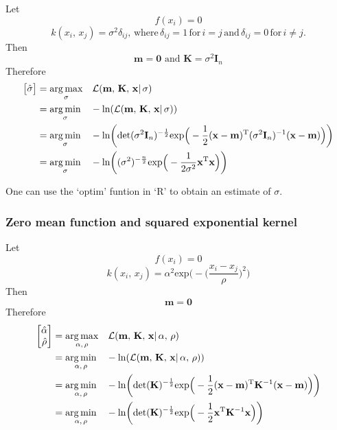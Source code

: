          Let \[f(x_{i}) = 0\]
          \[k(x_{i},\, x_{j}) = \sigma^2\delta_{ij}, \, \text{where} \, \delta_{ij} = 1 \, \text{for} \, i = j \, \text{and} \, \delta_{ij} = 0 \, \text{for} \, i \neq j.\]
         Then \[\mathbf{m} = \mathbf{0} \text{ and } \mathbf{K} = \sigma^2\mathbf{I}_{n}\]
         Therefore
         \begin{align*}
            \begin{bmatrix} \hat{\sigma} \end{bmatrix}
            & = \underset{\sigma}{\arg\max} \quad \mathcal{L}(\mathbf{m} ,\, \mathbf{K} ,\, \mathbf{x}| \, \sigma)\\
            & = \underset{\sigma}{\arg\min} \quad -\text{ln}(\mathcal{L}(\mathbf{m} ,\, \mathbf{K} ,\, \mathbf{x}| \, \sigma))\\
            & = \underset{\sigma}{\arg\min} \quad -\text{ln} \bigg(\text{det}(\sigma^2\mathbf{I}_{n})^{-\frac{1}{2}} 
            \text{exp} \Big(-\frac{1}{2} (\mathbf{x} - \mathbf{m})^{\text{\text{T}}} (\sigma^2\mathbf{I}_{n})^{-1} (\mathbf{x} - \mathbf{m}) \Big) \bigg)\\
            & = \underset{\sigma}{\arg\min} \quad -\text{ln} \bigg((\sigma^2)^{-\frac{n}{2}} 
            \text{exp} \Big(-\frac{1}{2\sigma^2} \mathbf{x}^{\text{\text{T}}} \mathbf{x} \Big) \bigg)
         \end{align*}
         
         One can use the `optim' funtion in `R' to obtain an estimate of \(\sigma\).

      \subsubsection{Zero mean function and squared exponential kernel}

         Let \[f(x_{i}) = 0\]
            \[k(x_{i},\, x_{j}) = \alpha^{2} \text{exp} \bigg(- \Big(\frac{x_i - x_j}{\rho} \Big)^2 \bigg)\]
         Then \[\mathbf{m} = \mathbf{0}\]
         Therefore
         \begin{align*}
            \begin{bmatrix} \hat{\alpha} \\ \hat{\rho} \end{bmatrix}
            & = \underset{\alpha ,\, \rho}{\arg\max} \quad \mathcal{L}(\mathbf{m} ,\, \mathbf{K} ,\, \mathbf{x}| \, \alpha ,\, \rho)\\
            & = \underset{\alpha ,\, \rho}{\arg\min} \quad -\text{ln}(\mathcal{L}(\mathbf{m} ,\, \mathbf{K} ,\, \mathbf{x}| \, \alpha ,\, \rho))\\
            & = \underset{\alpha ,\, \rho}{\arg\min} \quad -\text{ln} \bigg(\text{det}(\mathbf{K})^{-\frac{1}{2}} 
            \text{exp} \Big(-\frac{1}{2} (\mathbf{x} - \mathbf{m})^{\text{\text{T}}} \mathbf{K}^{-1} (\mathbf{x} - \mathbf{m}) \Big) \bigg)\\
            & = \underset{\alpha ,\, \rho}{\arg\min} \quad -\text{ln} \bigg(\text{det}(\mathbf{K})^{-\frac{1}{2}} 
            \text{exp} \Big(-\frac{1}{2} \mathbf{x}^{\text{\text{T}}} \mathbf{K}^{-1} \mathbf{x} \Big) \bigg)
         \end{align*}
         
